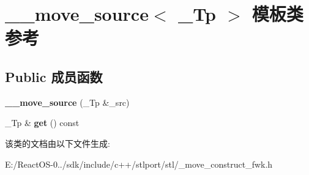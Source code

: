 \hypertarget{class____move__source}{}\section{\+\_\+\+\_\+move\+\_\+source$<$ \+\_\+\+Tp $>$ 模板类 参考}
\label{class____move__source}
\subsection*{Public 成员函数}
\begin{DoxyCompactItemize}
\item 
\mbox{\label{class____move__source_a3a2c47f755f567776175b58d21b463b0}} 
{\bfseries \+\_\+\+\_\+move\+\_\+source} (\+\_\+\+Tp \&\+\_\+src)
\item 
\mbox{\label{class____move__source_a13f1ff428404f9306ec756976142e1df}} 
\+\_\+\+Tp \& {\bfseries get} () const
\end{DoxyCompactItemize}


该类的文档由以下文件生成\+:\begin{DoxyCompactItemize}
\item 
E\+:/\+React\+O\+S-\/0../sdk/include/c++/stlport/stl/\+\_\+move\+\_\+construct\+\_\+fwk.\+h\end{DoxyCompactItemize}
